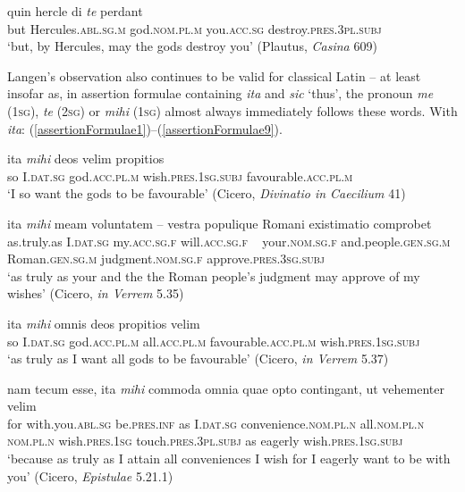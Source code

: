\begin{exe}
\ex
\gll quin hercle di \emph{te} perdant\\
but Hercules.\textsc{abl.sg.m} god.\textsc{nom.pl.m} you.\textsc{acc.sg} destroy.\textsc{pres.3pl.subj}\\
\trans `but, by Hercules, may the gods destroy you' (Plautus, \textit{Casina} 609)
\label{formulaeWithDi17}
\end{exe}

Langen's \citeyearpar{Langen1857} observation also continues to be valid for classical Latin -- at least insofar as, in assertion formulae containing \emph{ita} and \emph{sic} `thus', the pronoun \emph{me} (\textsc{1sg}), \emph{te} (\textsc{2sg}) or \emph{mihi} (\textsc{1sg}) almost always immediately follows these words. With \emph{ita}: (\ref{assertionFormulae1})--(\ref{assertionFormulae9}).

\begin{exe}
\ex
\gll ita \emph{mihi} deos velim propitios\\
so I.\textsc{dat.sg} god.\textsc{acc.pl.m} wish.\textsc{pres.1sg.subj} favourable.\textsc{acc.pl.m}\\
\trans `I so want the gods to be favourable’ (Cicero, \textit{Divinatio in Caecilium} 41)
\label{assertionFormulae1}
\end{exe}

\begin{exe}
\ex
\gll ita \emph{mihi} meam voluntatem – vestra populique Romani existimatio comprobet\\
as.truly.as I.\textsc{dat.sg} my.\textsc{acc.sg.f} will.\textsc{acc.sg.f} ~ your.\textsc{nom.sg.f} and.people.\textsc{gen.sg.m} Roman.\textsc{gen.sg.m} judgment.\textsc{nom.sg.f} approve.\textsc{pres.3sg.subj}\\
\trans `as truly as your and the the Roman people's judgment may approve of my wishes’ (Cicero, \textit{in Verrem} 5.35)
\label{assertionFormulae2}
\end{exe}

\begin{exe}
\ex
\gll ita \emph{mihi} omnis deos propitios velim\\
so I.\textsc{dat.sg} god.\textsc{acc.pl.m} all.\textsc{acc.pl.m} favourable.\textsc{acc.pl.m} wish.\textsc{pres.1sg.subj}\\
\trans `as truly as I want all gods to be favourable’ (Cicero, \textit{in Verrem} 5.37)
\label{assertionFormulae3}
\end{exe}

\begin{exe}
\ex
\gll nam tecum esse, ita \emph{mihi} commoda omnia quae opto contingant, ut vehementer velim\\
for with.you.\textsc{abl.sg} be.\textsc{pres.inf} as I.\textsc{dat.sg} convenience.\textsc{nom.pl.n} all.\textsc{nom.pl.n} \textsc{nom.pl.n} wish.\textsc{pres.1sg} touch.\textsc{pres.3pl.subj} as eagerly wish.\textsc{pres.1sg.subj}\\
\trans `because as truly as I attain all conveniences I wish for I eagerly want to be with you’ (Cicero, \textit{Epistulae} 5.21.1)
\label{assertionFormulae4}
\end{exe}


